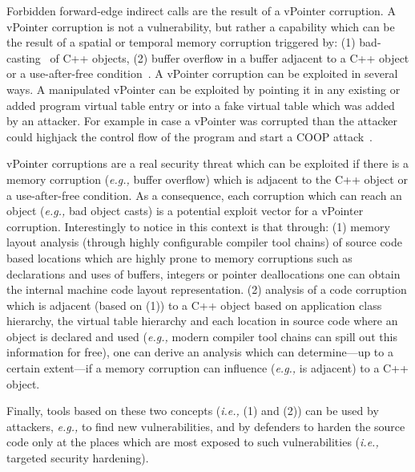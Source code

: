 Forbidden forward-edge indirect calls are the result of a vPointer corruption. A vPointer corruption is not a vulnerability, but rather a capability which
can be the result of a spatial or temporal memory corruption triggered by: 
(1) bad-casting~\cite{byoungyoung:typecasting} of C++ objects, 
(2) buffer overflow in a buffer adjacent to a C++ object or a use-after-free condition~\cite{schuster:coop}.
A vPointer corruption can be exploited in several ways. A manipulated vPointer can be exploited by pointing it in any existing or added program virtual 
table entry or into a fake virtual table which was added by an attacker. For example in case a vPointer
was corrupted than the attacker could highjack the control flow of the program and start a COOP attack~\cite{schuster:coop}.

vPointer corruptions are a real security threat which can be exploited if there is a memory corruption (\textit{e.g.,} buffer overflow) which is adjacent 
to the C++ object or a use-after-free condition. As a consequence, each corruption which can reach an object (\textit{e.g.,} bad object casts) is a potential
exploit vector for a vPointer corruption. Interestingly to notice in this context is that through:
(1) memory layout analysis (through highly configurable compiler tool chains) of source code based locations which are highly prone to memory corruptions such 
as declarations and uses of buffers, integers or pointer deallocations one can obtain the internal machine code layout representation.
(2) analysis of a code corruption which is adjacent (based on (1)) to a C++ object based on application class hierarchy, the virtual table hierarchy and each
location in source code where an object is declared and used (\textit{e.g.,} modern compiler tool chains can spill out this information for free), one can 
derive an analysis which can determine---up to a certain extent---if a memory corruption can influence (\textit{e.g.,} is adjacent) to a C++ object.

Finally, tools based on these two concepts (\textit{i.e.,} (1) and (2)) can be used by attackers, \textit{e.g.,} to find new vulnerabilities, and by defenders
to harden the source code only at the places which are most exposed to such vulnerabilities (\textit{i.e.,} targeted security hardening).


